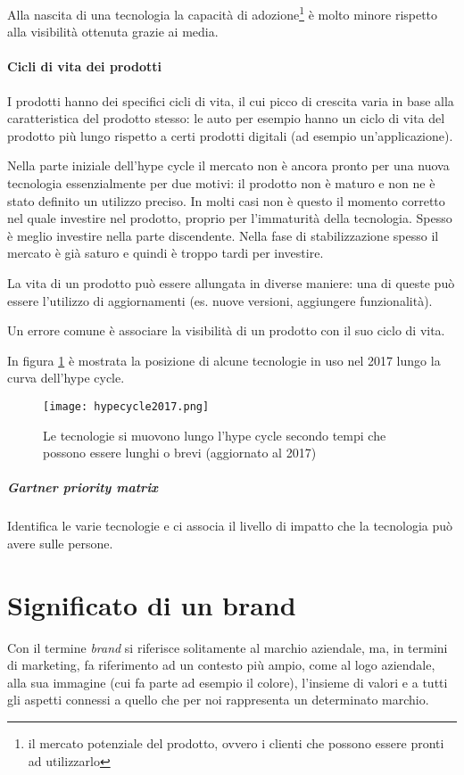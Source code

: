 Alla nascita di una tecnologia la capacità di adozione\footnote{il mercato
potenziale del prodotto, ovvero i clienti che possono essere pronti ad
utilizzarlo} è molto minore rispetto alla visibilità ottenuta grazie ai media.

\paragraph*{Cicli di vita dei prodotti} I prodotti hanno dei specifici cicli di
vita, il cui picco di crescita varia in base alla caratteristica del prodotto
stesso: le auto per esempio hanno un ciclo di vita del prodotto più lungo
rispetto a certi prodotti digitali (ad esempio un'applicazione).

Nella parte iniziale dell'hype cycle il mercato non è ancora pronto per una
nuova tecnologia essenzialmente per due motivi: il prodotto non è maturo e non
ne è stato definito un utilizzo preciso. In molti casi non è questo il momento
corretto nel quale investire nel prodotto, proprio per l'immaturità della
tecnologia. Spesso è meglio investire nella parte discendente. Nella fase di
stabilizzazione spesso il mercato è già saturo e quindi è troppo tardi per
investire.

La vita di un prodotto può essere allungata in diverse maniere:
una di queste può essere l'utilizzo di aggiornamenti (es. nuove versioni,
aggiungere funzionalità).

Un errore comune è associare la visibilità di un prodotto con il suo ciclo di
vita.

In figura \ref{fig:hypecycle2017} è mostrata la posizione di alcune tecnologie
in uso nel 2017 lungo la curva dell'hype cycle.

\begin{figure}[H]
\centering
\texttt{[image: hypecycle2017.png]}
\caption[Hype Cycle 2017]{Le tecnologie si muovono lungo l'hype cycle secondo
tempi che possono essere lunghi o brevi (aggiornato al 2017)}
\label{fig:hypecycle2017}
\end{figure}

\subparagraph*{Gartner priority matrix} Identifica le varie tecnologie e ci
associa il livello di impatto che la tecnologia può avere sulle persone.

\section{Significato di un brand}
\begin{definition}[Brand]
Con il termine \textit{brand} si riferisce solitamente al marchio aziendale,
ma, in termini di marketing, fa riferimento ad un contesto più ampio, come al
logo aziendale, alla sua immagine (cui fa parte ad esempio il colore),
l'insieme di valori e a tutti gli aspetti connessi a quello che per noi
rappresenta un determinato marchio. 
\end{definition}

